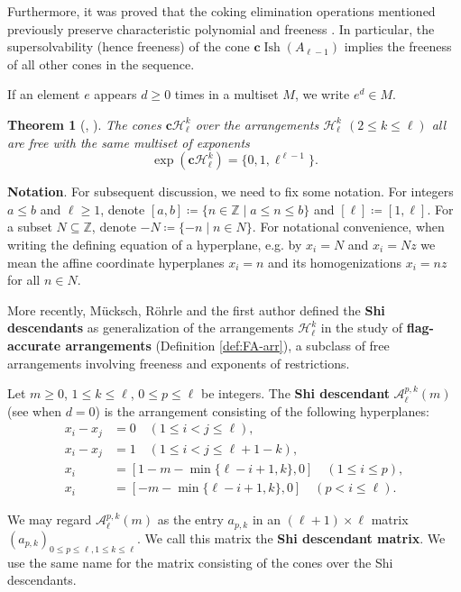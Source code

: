 \documentclass[11pt]{article}
\newtheorem{theorem}[theo]{Theorem}
\theoremstyle{definition}
\numberwithin{equation}{section}
\DeclareMathOperator{\Ish}{Ish}
\newcommand{\A}{\mathcal{A}}
\newcommand{\Hh}{\mathcal{H}}
\newcommand{\Z}{\mathbb{Z}}
\newcommand{\cc}{\mathbf{c}}
\newcommand{\tbf}{\textbf}
\begin{document}
Furthermore, it was proved that the coking elimination operations mentioned previously preserve characteristic polynomial and freeness  \cite[Theorems 3.1 and 4.1]{ATT24}. 
In particular, the supersolvability (hence freeness) of the cone $\cc\Ish(A_{\ell-1}) $ implies the freeness of all other cones in the sequence.

 If an element $e$ appears $d\ge0$ times  in a multiset $M$, we  write $e^d \in M$.

\begin{theorem}[{\cite[Theorem 2.2]{DG18}}, {\cite[Theorem 1.6]{ATT24}}]\label{Shi/Ish interpolation}
The cones $\cc\Hh_{\ell}^{k}$ over the arrangements $\Hh_{\ell}^{k}$ $(2 \leq k \leq \ell)$ all are free with the same multiset of exponents 
$$\exp(\cc\Hh_{\ell}^{k}) = \{0,1, \ell^{\ell-1} \}.$$ 
\end{theorem}
 
 
\textbf{Notation}. For subsequent discussion, we need to fix some notation. 
 For integers $a\le b$ and $\ell\ge1$, denote $[a,b] \coloneqq \{n\in\Z\mid a \le n\le b\}$ and $[\ell] \coloneqq [1,\ell]$. 
For a subset $N\subseteq \Z$, denote $-N \coloneqq \{-n\mid n\in N\}.$ 
For notational convenience,  when writing the defining equation of a hyperplane, e.g. by $x_{i} =N$ and  $x_{i} =  Nz$ we mean the affine coordinate hyperplanes $x_{i}=n$ and its homogenizations $x_{i} =nz$ for all  $ n \in N$. 

More recently, M\"ucksch, R\"ohrle and the first author  \cite{MRT24} defined the \tbf{Shi descendants} as generalization of the arrangements $\Hh_{\ell}^{k}$ in the study of \tbf{flag-accurate arrangements}  (Definition \ref{def:FA-arr}), a subclass of free arrangements involving freeness and exponents of restrictions.

Let  $m\ge 0$, $1 \le k \le \ell$, $0 \le p \le \ell$ be integers. 
The \textbf{Shi descendant} $\A^{p,k}_\ell(m)  $ (see \cite[Definition 7.15]{MRT24} when $d=0$) is the arrangement consisting of the following hyperplanes:
\begin{align*}
x_{i} - x_{j} &= 0\quad  (1 \leq i < j \leq \ell), \\
x_{i} - x_{j} &= 1 \quad (1 \leq i < j \leq \ell+1-k), \\
x_i&= [1- m-\min\{\ell-i+1, k\}  , 0 ]  \quad (1 \leq   i \leq p), \\
x_i&= [- m-\min\{\ell-i+1, k\}   , 0]  \quad (p<  i \leq \ell).
\end{align*}

We may regard $\A^{p,k}_\ell (m)$ as the entry $a_{p,k}$ in an $(\ell+1)\times \ell$ matrix $(a_{p,k})_{0 \le p \le \ell, 1 \le k \le \ell}$. 
We call this matrix the  \tbf{Shi descendant matrix}. 
We use the same name for the matrix consisting of the cones over the Shi descendants.
\end{document}
